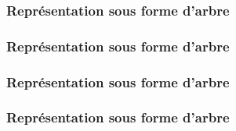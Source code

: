 

\begin{frame}
  \frametitle{Représentation sous forme d'arbre}
  \rechercheAleatoireOne
\end{frame}

\begin{frame}
  \frametitle{Représentation sous forme d'arbre}
  \rechercheAleatoireTwo
\end{frame}

\begin{frame}
  \frametitle{Représentation sous forme d'arbre}
  \rechercheAleatoireThree
\end{frame}

\begin{frame}
  \frametitle{Représentation sous forme d'arbre}
  \rechercheAleatoireFour
\end{frame}
